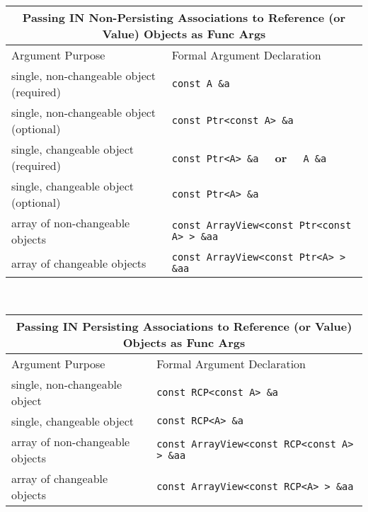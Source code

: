 %
\begin{tabular}{|l|l|}
%
\multicolumn{2}{c}{\textbf{Passing IN Non-Persisting Associations to Reference (or Value) Objects as Func Args}} \\
%
\hline
Argument Purpose
& Formal Argument Declaration \\
\hline
\hline
single, non-changeable object (required)
& {}\texttt{const A \&a} \\
\hline
single, non-changeable object (optional)
& {}\texttt{const Ptr<const A> \&a} \\
\hline
single, changeable object (required)
& {}\texttt{const Ptr<A> \&a}  $\;\;\;\;$\textbf{or}$\;\;\;\;$ {}\texttt{A \&a} \\
\hline
single, changeable object (optional)
& \texttt{const Ptr<A> \&a} \\
\hline
array of non-changeable objects
& {}\texttt{const ArrayView<const Ptr<const A> > \&aa} \\
\hline
array of changeable objects
& {}\texttt{const ArrayView<const Ptr<A> > \&aa} \\
\hline
\end{tabular} \\[3ex]
%
\begin{tabular}{|l|l|}
%
\multicolumn{2}{c}{\textbf{Passing IN Persisting Associations to Reference (or Value) Objects as Func Args}} \\
%
\hline
Argument Purpose & Formal Argument Declaration \\
\hline
\hline
single, non-changeable object
& {}\texttt{const RCP<const A> \&a} \\
\hline
single, changeable object
& {}\texttt{const RCP<A> \&a} \\
\hline
array of non-changeable objects
& {}\texttt{const ArrayView<const RCP<const A> > \&aa} \\
\hline
array of changeable objects
& {}\texttt{const ArrayView<const RCP<A> > \&aa} \\
\hline
\end{tabular} \\[3ex]
%
